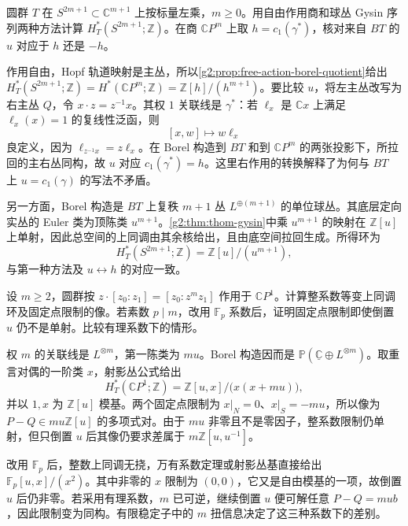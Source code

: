 \begin{exercise}\label{g2:ex:equivariant-hopf-sphere}
	圆群 \(T\) 在 \(S^{2m+1}\subset\mathbb C^{m+1}\) 上按标量左乘，\(m\ge0\)。用自由作用商和球丛 Gysin 序列两种方法计算 \(H_T^*(S^{2m+1};\mathbb Z)\)。在商 \(\mathbb CP^m\) 上取 \(h=c_1(\gamma^*)\)，核对来自 \(BT\) 的 \(u\) 对应于 \(h\) 还是 \(-h\)。
\end{exercise}
\begin{solution}
	作用自由，Hopf 轨道映射是主丛，所以\cref{g2:prop:free-action-borel-quotient}给出 \(H_T^*(S^{2m+1};\mathbb Z)=H^*(\mathbb CP^m;\mathbb Z)=\mathbb Z[h]/(h^{m+1})\)。要比较 \(u\)，将左主丛改写为右主丛 \(Q\)，令 \(x\cdot z=z^{-1}x\)。其权 \(1\) 关联线是 \(\gamma^*\)：若 \(\ell_x\) 是 \(\mathbb Cx\) 上满足 \(\ell_x(x)=1\) 的复线性泛函，则
	\[
		[x,w]\longmapsto w\ell_x
	\]
	良定义，因为 \(\ell_{z^{-1}x}=z\ell_x\)。在 Borel 构造到 \(BT\) 和到 \(\mathbb CP^m\) 的两张投影下，所拉回的主右丛同构，故 \(u\) 对应 \(c_1(\gamma^*)=h\)。这里右作用的转换解释了为何与 \(BT\) 上 \(u=c_1(\gamma)\) 的写法不矛盾。

	另一方面，Borel 构造是 \(BT\) 上复秩 \(m+1\) 丛 \(L^{\oplus(m+1)}\) 的单位球丛。其底层定向实丛的 Euler 类为顶陈类 \(u^{m+1}\)。\cref{g2:thm:thom-gysin}中乘 \(u^{m+1}\) 的映射在 \(\mathbb Z[u]\) 上单射，因此总空间的上同调由其余核给出，且由底空间拉回生成。所得环为
	\[
		H_T^*(S^{2m+1};\mathbb Z)=\mathbb Z[u]/(u^{m+1}),
	\]
	与第一种方法及 \(u\leftrightarrow h\) 的对应一致。
\end{solution}

\begin{exercise}\label{g2:ex:weighted-sphere-coefficients}
	设 \(m\ge2\)，圆群按 \(z\cdot[z_0:z_1]=[z_0:z^m z_1]\) 作用于 \(\mathbb CP^1\)。计算整系数等变上同调环及固定点限制的像。若素数 \(p\mid m\)，改用 \(\mathbb F_p\) 系数后，证明固定点限制即使倒置 \(u\) 仍不是单射。比较有理系数下的情形。
\end{exercise}
\begin{solution}
	权 \(m\) 的关联线是 \(L^{\otimes m}\)，第一陈类为 \(mu\)。Borel 构造因而是 \(\mathbb P(\underline{\mathbb C}\oplus L^{\otimes m})\)。取重言对偶的一阶类 \(x\)，射影丛公式给出
	\[
		H_T^*(\mathbb CP^1;\mathbb Z)=\mathbb Z[u,x]/\bigl(x(x+mu)\bigr),
	\]
	并以 \(1,x\) 为 \(\mathbb Z[u]\) 模基。两个固定点限制为 \(x|_N=0\)、\(x|_S=-mu\)，所以像为 \(P-Q\in mu\mathbb Z[u]\) 的多项式对。由于 \(mu\) 非零且不是零因子，整系数限制仍单射，但只倒置 \(u\) 后其像仍要求差属于 \(m\mathbb Z[u,u^{-1}]\)。

	改用 \(\mathbb F_p\) 后，整数上同调无挠，万有系数定理或射影丛基直接给出 \(\mathbb F_p[u,x]/(x^2)\)。其中非零的 \(x\) 限制为 \((0,0)\)，它又是自由模基的一项，故倒置 \(u\) 后仍非零。若采用有理系数，\(m\) 已可逆，继续倒置 \(u\) 便可解任意 \(P-Q=mu b\)，因此限制变为同构。有限稳定子中的 \(m\) 扭信息决定了这三种系数下的差别。
\end{solution}

